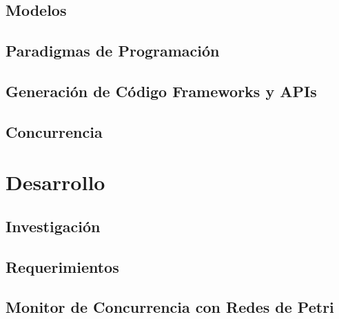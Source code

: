 \documentclass{report}
\begin{document}
        \chapter{Modelos}
            
        \chapter{Paradigmas de Programación}
            
            
            
        \chapter{Generación de Código Frameworks y APIs}
            \label{generacion_frameworks_apis}
            
            
        \chapter{Concurrencia}
            

    \part{Desarrollo}
        \chapter{Investigación}
            \label{cap:investigacion}
            
        \chapter{Requerimientos}
            
        \chapter{Monitor de Concurrencia con Redes de Petri}
        	\label{cap:petri_monitor}
            
            
            
\end{document}
